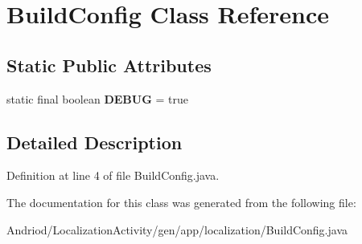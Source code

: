 \hypertarget{classapp_1_1localization_1_1_build_config}{\section{Build\-Config Class Reference}
\label{classapp_1_1localization_1_1_build_config}
}
\subsection*{Static Public Attributes}
\begin{DoxyCompactItemize}
\item 
\hypertarget{classapp_1_1localization_1_1_build_config_a8270736aa6257cdc33f11a875840a05e}{static final boolean {\bfseries D\-E\-B\-U\-G} = true}\label{classapp_1_1localization_1_1_build_config_a8270736aa6257cdc33f11a875840a05e}

\end{DoxyCompactItemize}


\subsection{Detailed Description}


Definition at line 4 of file Build\-Config.\-java.



The documentation for this class was generated from the following file\-:\begin{DoxyCompactItemize}
\item 
Andriod/\-Localization\-Activity/gen/app/localization/Build\-Config.\-java\end{DoxyCompactItemize}
